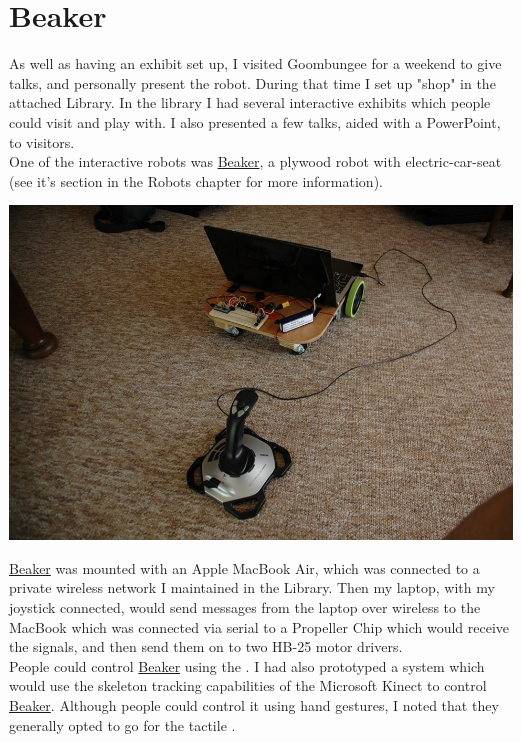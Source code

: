 	\section{Beaker}
		As well as having an exhibit set up, I visited Goombungee for a weekend to give talks, and personally present the robot. During that time I set up "shop" in the attached Library. In the library I had several interactive exhibits which people could visit and play with. I also presented a few talks, aided with a PowerPoint, to visitors.\\
		
		One of the interactive robots was \hyperref[sec:Beaker]{Beaker}, a plywood robot with electric-car-seat  (see it's section in the Robots chapter for more information).\\
		
		\centerline{\includegraphics[width=0.75\linewidth]{images/beaker_joystick}}
		
		\hyperref[sec:Beaker]{Beaker} was mounted with an Apple MacBook Air, which was connected to a private wireless network I maintained in the Library. Then my laptop, with my joystick connected, would send messages from the laptop over wireless to the MacBook which was connected via serial to a Propeller Chip which would receive the signals, and then send them on to two HB-25 motor drivers.\\
		
		People could control \hyperref[sec:Beaker]{Beaker} using the . I had also prototyped a system which would use the skeleton tracking capabilities of the Microsoft Kinect to control \hyperref[sec:Beaker]{Beaker}. Although people could control it using hand gestures, I noted that they generally opted to go for the tactile .\\
	
